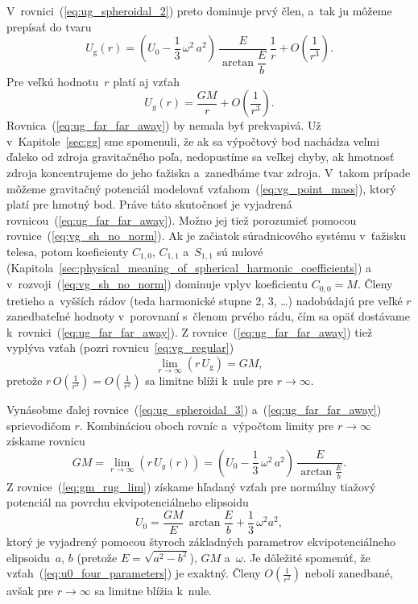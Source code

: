 \documentclass[a4paper, 12pt]{book}
\newcommand{\gidx}{\mathrm g}
\begin{document}
V~rovnici~(\ref{eq:ug_spheroidal_2}) preto dominuje prvý člen, a~tak ju môžeme 
prepísať do tvaru
%
\begin{equation}
\label{eq:ug_spheroidal_3}
U_\gidx(r) = \left( U_0 - \frac{1}{3} \, \omega^2 \, a^2 \right) \, 
\frac{E}{\arctan\dfrac{E}{b}} \, \frac{1}{r} + O\left( \frac{1}{r^3} \right){.}
\end{equation}
%
Pre veľkú hodnotu~$r$ platí aj vzťah
%
\begin{equation}
\label{eq:ug_far_far_away}
U_g(r) = \frac{GM}{r} + O\left( \frac{1}{r^3}\right){.}
\end{equation}
%
Rovnica~(\ref{eq:ug_far_far_away}) by nemala byť prekvapivá.  Už 
v~Kapitole~\ref{sec:gg} sme spomenuli, že ak sa výpočtový bod nachádza veľmi 
ďaleko od zdroja gravitačného poľa, nedopustíme sa veľkej chyby, ak hmotnosť 
zdroja koncentrujeme do jeho ťažiska a~zanedbáme tvar zdroja.  V~takom prípade 
môžeme gravitačný potenciál modelovať vzťahom~(\ref{eq:vg_point_mass}), ktorý 
platí pre hmotný bod.  Práve táto skutočnosť je vyjadrená 
rovnicou~(\ref{eq:ug_far_far_away}).  Možno jej tiež porozumieť pomocou 
rovnice~(\ref{eq:vg_sh_no_norm}).  Ak je začiatok súradnicového systému 
v~ťažisku telesa, potom koeficienty $C_{1,0}$, $C_{1,1}$ a~$S_{1,1}$ sú nulové 
(Kapitola~\ref{sec:physical_meaning_of_spherical_harmonic_coefficients}) 
a v~rozvoji~(\ref{eq:vg_sh_no_norm}) dominuje vplyv koeficientu $C_{0,0} = M$.  
Členy tretieho a~vyšších rádov (teda harmonické stupne $2$, $3$, \dots) 
nadobúdajú pre veľké $r$ zanedbateľné hodnoty v~porovnaní s~členom prvého rádu, 
čím sa opäť dostávame k~rovnici~(\ref{eq:ug_far_far_away}).  
Z rovnice~(\ref{eq:ug_far_far_away}) tiež vyplýva vzťah (pozri 
rovnicu~\ref{eq:vg_regular})
%
\begin{equation}
\lim_{r \rightarrow \infty} (r \, U_\gidx) = GM{,}
\end{equation}
%
pretože $r \, O \left( \frac{1}{r^3} \right) = O\left( \frac{1}{r^2} \right)$ 
sa limitne blíži k~nule pre $r \rightarrow \infty$.

Vynásobme ďalej rovnice~(\ref{eq:ug_spheroidal_3}) a~(\ref{eq:ug_far_far_away}) 
sprievodičom $r$.  Kombináciou oboch rovníc a~výpočtom limity pre $r 
\rightarrow \infty$ získame rovnicu
%
\begin{equation}
\label{eq:gm_rug_lim}
GM = \lim_{r \rightarrow \infty} (r \, U_g(r)) = \left( U_0 - \frac{1}{3} \, 
\omega^2 \, a^2 \right) \, \frac{E}{\arctan\frac{E}{b}}{.}
\end{equation}
%
Z rovnice~(\ref{eq:gm_rug_lim}) získame hľadaný vzťah pre normálny tiažový 
potenciál na povrchu ekvipotenciálneho elipsoidu
%
\begin{equation}
\label{eq:u0_four_parameters}
U_0 = \frac{GM}{E} \, \arctan\frac{E}{b} + \frac{1}{3} \, \omega^2 a^2{,}
\end{equation}
%
ktorý je vyjadrený pomocou štyroch základných parametrov ekvipotenciálneho 
elipsoidu~$a$, $b$ (pretože $E = \sqrt{a^2 - b^2}$), $GM$ a~$\omega$.  Je 
dôležité spomenúť, že vzťah~(\ref{eq:u0_four_parameters}) je exaktný.  Členy 
$O\left( \frac{1}{r^2} \right)$ neboli zanedbané, avšak pre $r \rightarrow 
\infty$ sa limitne blížia k~nule.
\end{document}
